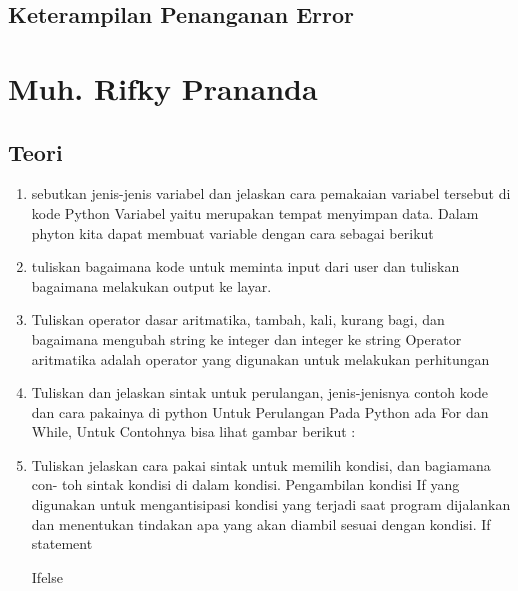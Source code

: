 \subsection{Keterampilan Penanganan Error}
    

	
\section{Muh. Rifky Prananda}
\subsection{Teori}
\begin{enumerate}
    \item sebutkan jenis-jenis variabel dan jelaskan cara pemakaian variabel tersebut di
    kode Python
    Variabel yaitu merupakan tempat menyimpan data. Dalam phyton kita dapat membuat variable dengan cara sebagai berikut
    

    \item tuliskan bagaimana kode untuk meminta input dari user dan tuliskan bagaimana
    melakukan output ke layar.
    

    \item Tuliskan operator dasar aritmatika, tambah, kali, kurang bagi, dan bagaimana
    mengubah string ke integer dan integer ke string
    Operator  aritmatika adalah operator yang digunakan untuk melakukan perhitungan
    

    \item Tuliskan dan jelaskan sintak untuk perulangan, jenis-jenisnya contoh kode dan
    cara pakainya di python
    Untuk Perulangan Pada Python ada For dan While, Untuk Contohnya bisa lihat gambar berikut :
    

    \item Tuliskan jelaskan cara pakai sintak untuk memilih kondisi, dan bagiamana con-
    toh sintak kondisi di dalam kondisi.
    Pengambilan kondisi If yang digunakan untuk mengantisipasi kondisi yang terjadi saat program dijalankan dan menentukan tindakan apa yang akan diambil sesuai dengan kondisi.
    If statement
    
    
    Ifelse
    
    

\end{enumerate}
